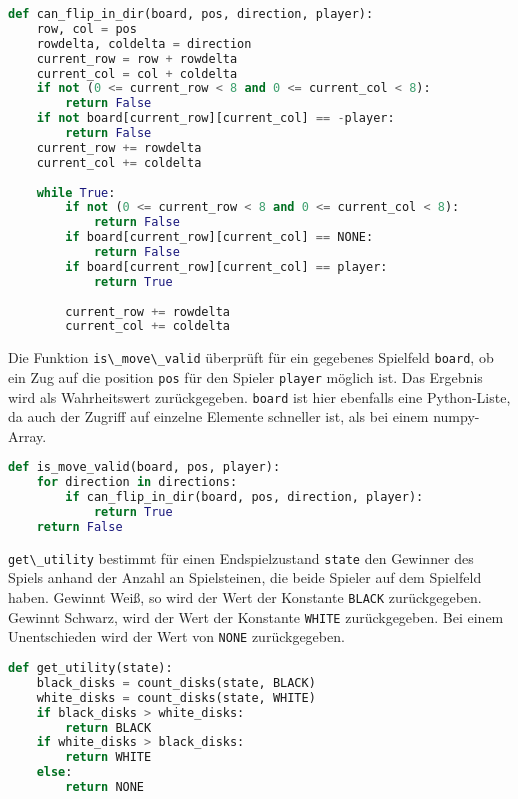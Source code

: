 \begin{lstlisting}[language=Python]
def can_flip_in_dir(board, pos, direction, player):
    row, col = pos
    rowdelta, coldelta = direction
    current_row = row + rowdelta
    current_col = col + coldelta
    if not (0 <= current_row < 8 and 0 <= current_col < 8):
        return False
    if not board[current_row][current_col] == -player:
        return False
    current_row += rowdelta
    current_col += coldelta
    
    while True:
        if not (0 <= current_row < 8 and 0 <= current_col < 8):
            return False
        if board[current_row][current_col] == NONE:
            return False           
        if board[current_row][current_col] == player:
            return True
    
        current_row += rowdelta
        current_col += coldelta
\end{lstlisting}

Die Funktion \passthrough{\lstinline!is\_move\_valid!} überprüft für ein
gegebenes Spielfeld \passthrough{\lstinline!board!}, ob ein Zug auf die
position \passthrough{\lstinline!pos!} für den Spieler
\passthrough{\lstinline!player!} möglich ist. Das Ergebnis wird als
Wahrheitswert zurückgegeben. \passthrough{\lstinline!board!} ist hier
ebenfalls eine Python-Liste, da auch der Zugriff auf einzelne Elemente
schneller ist, als bei einem numpy-Array.

\begin{lstlisting}[language=Python]
def is_move_valid(board, pos, player):
    for direction in directions:
        if can_flip_in_dir(board, pos, direction, player):
            return True
    return False
\end{lstlisting}

\passthrough{\lstinline!get\_utility!} bestimmt für einen
Endspielzustand \passthrough{\lstinline!state!} den Gewinner des Spiels
anhand der Anzahl an Spielsteinen, die beide Spieler auf dem Spielfeld
haben. Gewinnt Weiß, so wird der Wert der Konstante
\passthrough{\lstinline!BLACK!} zurückgegeben. Gewinnt Schwarz, wird der
Wert der Konstante \passthrough{\lstinline!WHITE!} zurückgegeben. Bei
einem Unentschieden wird der Wert von \passthrough{\lstinline!NONE!}
zurückgegeben.

\begin{lstlisting}[language=Python]
def get_utility(state):
    black_disks = count_disks(state, BLACK)
    white_disks = count_disks(state, WHITE)
    if black_disks > white_disks:
        return BLACK
    if white_disks > black_disks:
        return WHITE
    else:
        return NONE
\end{lstlisting}

